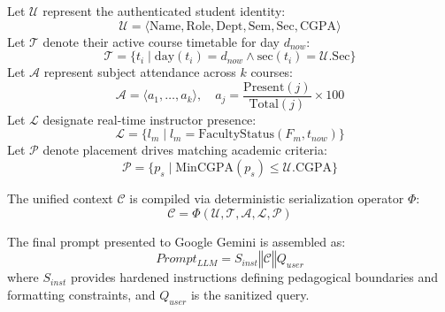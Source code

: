 \documentclass[conference]{IEEEtran}
\begin{document}
Let $\mathcal{U}$ represent the authenticated student identity:
\begin{equation}
\mathcal{U} = \langle \text{Name}, \text{Role}, \text{Dept}, \text{Sem}, \text{Sec}, \text{CGPA} \rangle
\end{equation}
Let $\mathcal{T}$ denote their active course timetable for day $d_{now}$:
\begin{equation}
\mathcal{T} = \{ t_i \mid \mathrm{day}(t_i) = d_{now} \land \mathrm{sec}(t_i) = \mathcal{U}.\mathrm{Sec} \}
\end{equation}
Let $\mathcal{A}$ represent subject attendance across $k$ courses:
\begin{equation}
\mathcal{A} = \langle a_1, \dots, a_k \rangle, \quad a_j = \frac{\mathrm{Present}(j)}{\mathrm{Total}(j)} \times 100
\end{equation}
Let $\mathcal{L}$ designate real-time instructor presence:
\begin{equation}
\mathcal{L} = \{ l_m \mid l_m = \mathrm{FacultyStatus}(F_m, t_{now}) \}
\end{equation}
Let $\mathcal{P}$ denote placement drives matching academic criteria:
\begin{equation}
\mathcal{P} = \{ p_s \mid \mathrm{MinCGPA}(p_s) \le \mathcal{U}.\mathrm{CGPA} \}
\end{equation}

The unified context $\mathcal{C}$ is compiled via deterministic serialization operator $\Phi$:
\begin{equation}
\mathcal{C} = \Phi(\mathcal{U}, \mathcal{T}, \mathcal{A}, \mathcal{L}, \mathcal{P})
\end{equation}

The final prompt presented to Google Gemini is assembled as:
\begin{equation}
Prompt_{LLM} = S_{inst} \mathbin{\Vert} \mathcal{C} \mathbin{\Vert} Q_{user}
\label{eq:gacb_prompt}
\end{equation}
where $S_{inst}$ provides hardened instructions defining pedagogical boundaries and formatting constraints, and $Q_{user}$ is the sanitized query.
\end{document}
